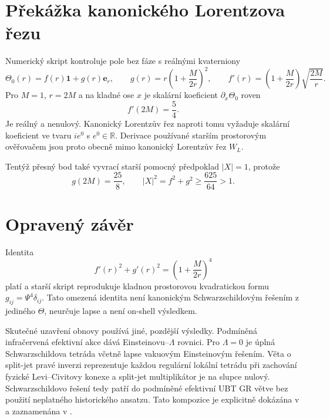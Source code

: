\documentclass[11pt,a4paper]{article}
\begin{document}
\section{Překážka kanonického Lorentzova řezu}
Numerický skript kontroluje pole bez fáze s reálnými kvaterniony
\begin{equation}
 \Theta_0(r)=f(r)\mathbf1+g(r)\mathbf e_r,
 \qquad
 g(r)=r\left(1+\frac{M}{2r}\right)^2,
 \qquad
 f'(r)=\left(1+\frac{M}{2r}\right)\sqrt{\frac{2M}{r}}.
 \label{eq:legacy-spatial}
\end{equation}
Pro $M=1$, $r=2M$ a na kladné ose $x$ je skalární koeficient
$\partial_x\Theta_0$ roven
\begin{equation}
 f'(2M)=\frac54.
 \label{eq:slice-witness}
\end{equation}
Je reálný a nenulový. Kanonický Lorentzův řez naproti tomu vyžaduje skalární
koeficient ve tvaru $i e^0$ s $e^0\in\mathbb R$. Derivace používané starším
prostorovým ověřovačem jsou proto obecně mimo kanonický Lorentzův řez $W_L$.

Tentýž přesný bod také vyvrací starší pomocný předpoklad $|X|=1$, protože
\begin{equation}
 g(2M)=\frac{25}{8},
 \qquad |X|^2=f^2+g^2\geq\frac{625}{64}>1.
 \label{eq:norm-witness}
\end{equation}

\section{Opravený závěr}
Identita
\begin{equation}
 f'(r)^2+g'(r)^2=\left(1+\frac{M}{2r}\right)^4
 \label{eq:spatial-identity}
\end{equation}
platí a starší skript reprodukuje kladnou prostorovou kvadratickou formu
$g_{ij}=\Psi^4\delta_{ij}$. Tato omezená identita není kanonickým
Schwarzschildovým řešením z jediného $\Theta$, neurčuje lapse a není on-shell
výsledkem.

Skutečné uzavření obnovy používá jiné, pozdější výsledky. Podmíněná
infračervená efektivní akce dává Einsteinovu--$\Lambda$ rovnici. Pro
$\Lambda=0$ je úplná Schwarzschildova tetráda včetně lapse vakuovým
Einsteinovým řešením. Věta o split-jet pravé inverzi reprezentuje každou
regulární lokální tetrádu při zachování fyzické Levi--Civitovy konexe a
split-jet multiplikátor je na slupce nulový. Schwarzschildovo řešení tedy patří
do podmíněné efektivní UBT GR větve bez použití neplatného historického ansatzu.
Tato kompozice je explicitně dokázána v
 a zaznamenána v
.
\end{document}
